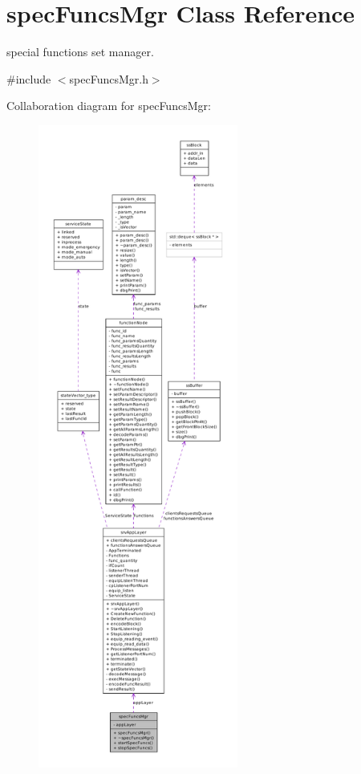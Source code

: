 \hypertarget{classspecFuncsMgr}{
\section{specFuncsMgr Class Reference}
\label{d1/ddf/classspecFuncsMgr}
}


special functions set manager.  




{\ttfamily \#include $<$specFuncsMgr.h$>$}



Collaboration diagram for specFuncsMgr:\nopagebreak
\begin{figure}[H]
\begin{center}
\leavevmode
\includegraphics[height=600pt]{d5/db1/classspecFuncsMgr__coll__graph}
\end{center}
\end{figure}
